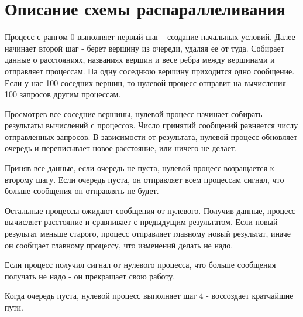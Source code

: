 \documentclass{report}
\begin{document}
\section*{Описание схемы распараллеливания}
\par Процесс с рангом 0 выполняет первый шаг - создание начальных условий. Далее начинает второй шаг - берет вершину из очереди, удаляя ее от туда. Собирает данные о расстояниях, названиях вершин и весе ребра между вершинами и отправляет процессам. На одну соседнюю вершину приходится одно сообщение. Если у нас 100 соседних вершин, то нулевой процесс отправит на вычисления 100 запросов другим процессам.
\par Просмотрев все соседние вершины, нулевой процесс начинает собирать результаты вычислений с процессов. Число принятий сообщений равняется числу отправленных запросов. В зависимости от результата, нулевой процесс обновляет очередь и переписывает новое расстояние, или ничего не делает.
\par Приняв все данные, если очередь не пуста, нулевой процесс возращается к второму шагу. Если очередь пуста, он отправляет всем процессам сигнал, что больше сообщения он отправлять не будет.
\par Остальные процессы ожидают сообщения от нулевого. Получив данные, процесс вычисляет расстояние и сравнивает с предыдущим результатом. Если новый результат меньше старого, процесс отправляет главному новый результат, иначе он сообщает главному процессу, что изменений делать не надо.
\par Если процесс получил сигнал от нулевого процесса, что больше сообщения получать не надо - он прекращает свою работу.
\par Когда очередь пуста, нулевой процесс выполняет шаг 4 - воссоздает кратчайшие пути.
\newpage

\end{document}
